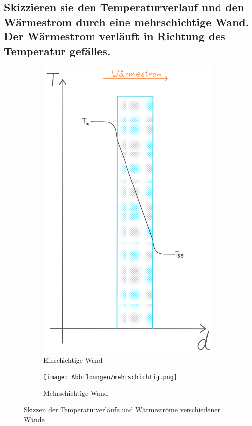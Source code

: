 \subsection{Skizzieren sie den Temperaturverlauf und den Wärmestrom durch eine mehrschichtige Wand. Der Wärmestrom verläuft in Richtung des Temperatur gefälles.}
\begin{figure}[H]
	\centering
	\begin{subfigure}[c]{0.303\textwidth}
		\includegraphics[width=\textwidth]{Abbildungen/einschichtig.png}
		\caption{Einschichtige Wand}
	\end{subfigure}
	\begin{subfigure}[c]{0.497\textwidth}
		\texttt{[image: Abbildungen/mehrschichtig.png]}
		\caption{Mehrschichtige Wand}
	\end{subfigure}
	\caption{Skizzen der Temperaturverläufe und Wärmeströme verschiedener Wände}
	\label{fig:230515_Temp-verlauf}
\end{figure}
